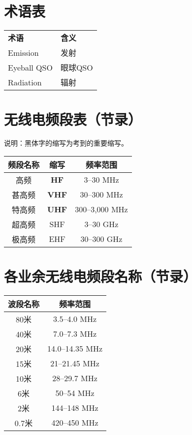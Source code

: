 \section{术语表}

\begin{longtable}[l]{ll}
	\textbf{术语} & \textbf{含义} \\
	Emission & 发射 \\
	Eyeball QSO & 眼球QSO \\
	Radiation & 辐射 \\
\end{longtable}

\newpage

\section{无线电频段表（节录）}

说明：黑体字的缩写为考到的重要缩写。

\begin{longtable}{|c|c|c|}
	\hline
	\textbf{频段名称} & \textbf{缩写} & \textbf{频率范围} \\
	\hline
	高频 & \textbf{HF} & 3–30 MHz \\
	\hline
	甚高频 & \textbf{VHF} & 30–300 MHz \\
	\hline
	特高频 & \textbf{UHF} & 300–3,000 MHz \\
	\hline
	超高频 & SHF & 3–30 GHz \\
	\hline
	极高频 & EHF & 30–300 GHz \\
	\hline
\end{longtable}

\newpage






\section{各业余无线电频段名称（节录）}


\begin{longtable}{|c|c|}
	\hline
	\textbf{波段名称} & \textbf{频率范围} \\
	\hline
	80米 & 3.5–4.0 MHz \\
	\hline
	40米 & 7.0–7.3 MHz \\
	\hline
	20米 & 14.0–14.35 MHz \\
	\hline
	15米 & 21–21.45 MHz \\
	\hline
	10米 & 28–29.7 MHz \\
	\hline
	6米 & 50–54 MHz \\
	\hline
	2米 & 144–148 MHz \\
	\hline
	0.7米 & 420–450 MHz \\
	\hline
\end{longtable}

